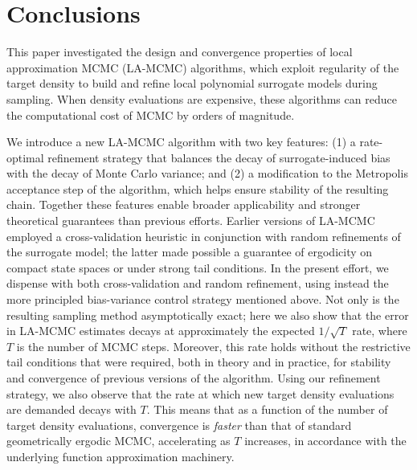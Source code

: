\section{Conclusions}
\label{sec:concs}
This paper investigated the design and convergence properties of local approximation MCMC (LA-MCMC) algorithms, which exploit regularity of the target density to build and refine local polynomial surrogate models during sampling. When density evaluations are expensive, these algorithms can reduce the computational cost of MCMC by orders of magnitude.

We introduce a new LA-MCMC algorithm with two key features: (1) a rate-optimal refinement strategy that balances the decay of surrogate-induced bias with the decay of Monte Carlo variance; and (2) a modification to the Metropolis acceptance step of the algorithm, which helps ensure stability of the resulting chain.
%
Together these features enable broader applicability and stronger theoretical guarantees than previous efforts. Earlier versions of LA-MCMC \citep{Conradetal2016} employed a cross-validation heuristic in conjunction with random refinements of the surrogate model; the latter made possible a guarantee of ergodicity on compact state spaces or under strong tail conditions. In the present effort, we dispense with both cross-validation and random refinement, using instead the more principled bias-variance control strategy mentioned above. Not only is the resulting sampling method asymptotically exact; here we also show that the error in LA-MCMC estimates decays at approximately the expected $1/\sqrt{T}$ rate, where $T$ is the number of MCMC steps. Moreover, this rate holds without the restrictive tail conditions that were required, both in theory and in practice, for stability and convergence of previous versions of the algorithm. 
%
Using our refinement strategy, we also observe that the rate at which new target density evaluations are demanded decays with $T$. This means that as a function of the number of target density evaluations, convergence is \textit{faster} than that of standard geometrically ergodic MCMC, accelerating as $T$ increases, in accordance with the underlying function approximation machinery.


